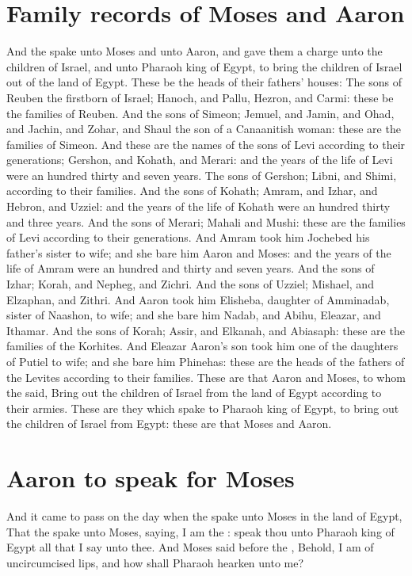 \begin{biblechapter}
\section*{Family records of Moses and Aaron}
\verse And the \LORD spake unto Moses and unto Aaron, and gave them a charge unto the children of Israel, and unto Pharaoh king of Egypt, to bring the children of Israel out of the land of Egypt.
\verse These be the heads of their fathers' houses: The sons of Reuben the firstborn of Israel; Hanoch, and Pallu, Hezron, and Carmi: these be the families of Reuben.
\verse And the sons of Simeon; Jemuel, and Jamin, and Ohad, and Jachin, and Zohar, and Shaul the son of a Canaanitish woman: these are the families of Simeon.
\verse And these are the names of the sons of Levi according to their generations; Gershon, and Kohath, and Merari: and the years of the life of Levi were an hundred thirty and seven years.
\verse The sons of Gershon; Libni, and Shimi, according to their families.
\verse And the sons of Kohath; Amram, and Izhar, and Hebron, and Uzziel: and the years of the life of Kohath were an hundred thirty and three years.
\verse And the sons of Merari; Mahali and Mushi: these are the families of Levi according to their generations.
\verse And Amram took him Jochebed his father's sister to wife; and she bare him Aaron and Moses: and the years of the life of Amram were an hundred and thirty and seven years.
\verse And the sons of Izhar; Korah, and Nepheg, and Zichri.
\verse And the sons of Uzziel; Mishael, and Elzaphan, and Zithri.
\verse And Aaron took him Elisheba, daughter of Amminadab, sister of Naashon, to wife; and she bare him Nadab, and Abihu, Eleazar, and Ithamar.
\verse And the sons of Korah; Assir, and Elkanah, and Abiasaph: these are the families of the Korhites.
\verse And Eleazar Aaron's son took him one of the daughters of Putiel to wife; and she bare him Phinehas: these are the heads of the fathers of the Levites according to their families.
\verse These are that Aaron and Moses, to whom the \LORD said, Bring out the children of Israel from the land of Egypt according to their armies.
\verse These are they which spake to Pharaoh king of Egypt, to bring out the children of Israel from Egypt: these are that Moses and Aaron.
\section*{Aaron to speak for Moses}
\verse And it came to pass on the day when the \LORD spake unto Moses in the land of Egypt,
\verse That the \LORD spake unto Moses, saying, I am the \LORD: speak thou unto Pharaoh king of Egypt all that I say unto thee.
\verse And Moses said before the \LORD, Behold, I am of uncircumcised lips, and how shall Pharaoh hearken unto me?
\end{biblechapter}

